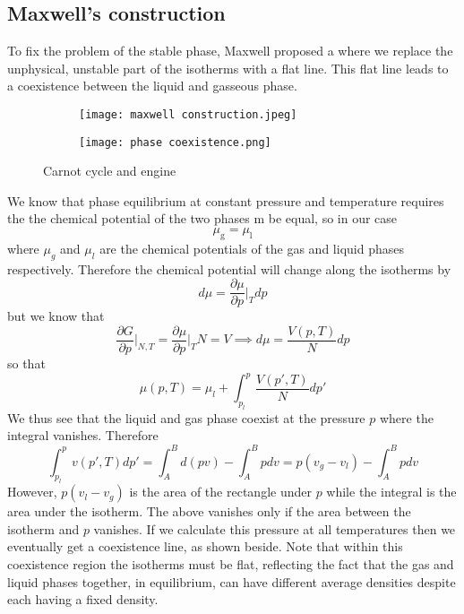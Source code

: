 \documentclass[a4paper,11pt,oneside]{book}
\begin{document}
\subsection*{Maxwell's construction}
To fix the problem of the stable phase, Maxwell proposed a where we replace the unphysical, unstable part of the isotherms with a flat line. This flat line leads to a coexistence between the liquid and gasseous phase.
\begin{figure}[h!]
\centering
\begin{subfigure}{0.45\textwidth}
  \centering
  \texttt{[image: maxwell construction.jpeg]}
  \label{fig:sub1}
\end{subfigure}%
\begin{subfigure}{0.4\textwidth}
  \centering
  \texttt{[image: phase coexistence.png]}
  \label{fig:sub2}
\end{subfigure}
\caption{Carnot cycle and engine}
\label{fig:test}
\end{figure}
We know that phase equilibrium at constant pressure and temperature requires the the chemical potential of the two phases m be equal, so in our case
\begin{equation}
    \mu_{\text{g}} = \mu_{\text{l}}
\end{equation}
where $\mu_g$ and $\mu_l$ are the chemical potentials of the gas and liquid phases respectively. Therefore the chemical potential will change along the isotherms by
\begin{equation}
    d\mu = \frac{\partial \mu}{\partial p}\bigg|_T dp
\end{equation}
but we know that
\begin{equation}
    \frac{\partial G}{\partial p}\bigg|_{N,T} = \frac{\partial \mu}{\partial p}\bigg|_T N = V \implies   d\mu = \frac{V(p,T)}{N} dp
\end{equation}
so that
\begin{equation}
    \mu(p,T) = \mu_l + \int_{p_l}^p \frac{V(p',T)}{N} dp'
\end{equation}
We thus see that the liquid and gas phase coexist at the pressure $p$ where the integral vanishes. Therefore
\begin{equation*}
    \int_{p_l}^p v(p',T) dp' = \int_{A}^B d(pv) - \int_{A}^B pdv = p(v_g-v_l) -  \int_{A}^B pdv 
\end{equation*}
However, $p(v_l-v_g)$ is the area of the rectangle under $p$ while the integral is the area under the isotherm. The above vanishes only if the area between the isotherm and $p$ vanishes. If we calculate this pressure at all temperatures then we eventually get a coexistence line, as shown beside. Note that within this coexistence region the isotherms must be flat, reflecting the fact that the gas and liquid phases together, in equilibrium, can have different average densities despite each having a fixed density.
\end{document}
